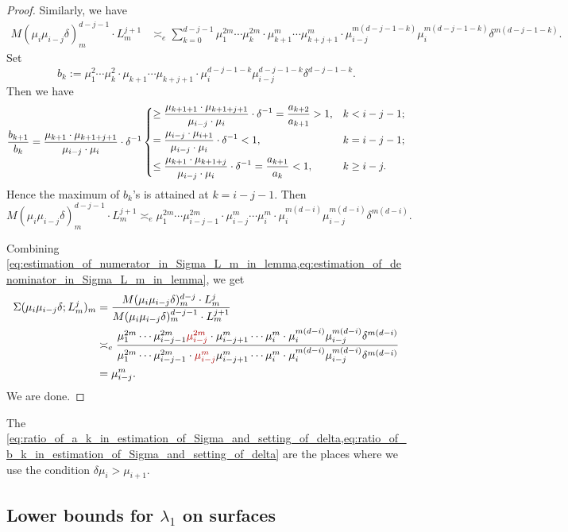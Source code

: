 \begin{proof}
    Similarly, we have
    \begin{align*}
      M(\mu_i \mu_{i-j} \delta)_m^{d-j-1} \cdot L_m^{j+1} & \asymp_e \sum_{k=0}^{d-j-1} \mu_1^{2m} \cdots \mu_k^{2m} \cdot \mu_{k+1}^m \cdots \mu_{k+j+1}^m \cdot \mu_{i-j}^{m(d-j-1-k)} \mu_i^{m(d-j-1-k)} \delta^{m(d-j-1-k)}.
    \end{align*}
    Set 
    \[ b_k := \mu_1^2 \cdots \mu_k^2 \cdot \mu_{k+1} \cdots \mu_{k+j+1} \cdot \mu_i^{d-j-1-k} \mu_{i-j}^{d-j-1-k} \delta^{d-j-1-k}. \]
    Then we have
    \begin{equation}\label{eq:ratio_of_b_k_in_estimation_of_Sigma_and_setting_of_delta}
      \frac{b_{k+1}}{b_k} = \frac{\mu_{k+1} \cdot \mu_{k+1+j+1}}{\mu_{i-j} \cdot \mu_i} \cdot \delta^{-1} 
      \begin{dcases}
      \geq \dfrac{\mu_{k+1+1} \cdot \mu_{k+1+j+1}}{\mu_{i-j} \cdot \mu_i} \cdot \delta^{-1} = \frac{a_{k+2}}{a_{k+1}} > 1, & k < i-j-1; \\
      = \dfrac{\mu_{i-j} \cdot \mu_{i+1}}{\mu_{i-j} \cdot \mu_i} \cdot \delta^{-1} < 1, & k = i-j-1; \\
      \leq \dfrac{\mu_{k+1} \cdot \mu_{k+1+j}}{\mu_{i-j} \cdot \mu_i} \cdot \delta^{-1} = \frac{a_{k+1}}{a_k} < 1, & k \geq i-j.
    \end{dcases}
    \end{equation}
    Hence the maximum of $b_k$'s is attained at $k = i-j-1$.
    Then
    \begin{equation}\label{eq:estimation_of_denominator_in_Sigma_L_m_in_lemma}
      M(\mu_i \mu_{i-j} \delta)_m^{d-j-1} \cdot L_m^{j+1} \asymp_e \mu_1^{2m} \cdots \mu_{i-j-1}^{2m} \cdot \mu_{i-j}^m \cdots \mu_{i}^m \cdot \mu_i^{m(d-i)} \mu_{i-j}^{m(d-i)} \delta^{m(d-i)}.
    \end{equation}

    Combining \cref{eq:estimation_of_numerator_in_Sigma_L_m_in_lemma,eq:estimation_of_denominator_in_Sigma_L_m_in_lemma}, we get 
    \begin{align*}
      \Sigma(\mu_i \mu_{i-j} \delta; L_m^j)_m & = \frac{M(\mu_i \mu_{i-j} \delta)_m^{d-j} \cdot L_m^{j}}{M(\mu_i \mu_{i-j} \delta)_m^{d-j-1} \cdot L_m^{j+1}} \\
      & \asymp_e \frac{\mu_1^{2m} \cdots \mu_{i-j-1}^{2m} \alert{\mu_{i-j}^{2m}} \cdot \mu_{i-j+1}^m \cdots \mu_{i}^m \cdot \mu_i^{m(d-i)} \mu_{i-j}^{m(d-i)} \delta^{m(d-i)}}{\mu_1^{2m} \cdots \mu_{i-j-1}^{2m} \cdot \alert{\mu_{i-j}^m} \mu_{i-j+1}^m \cdots \mu_{i}^m \cdot \mu_i^{m(d-i)} \mu_{i-j}^{m(d-i)} \delta^{m(d-i)}} \\
      & = \mu_{i-j}^{m}.
    \end{align*}
    We are done.
  \end{proof}
  \begin{remark}
    The \cref{eq:ratio_of_a_k_in_estimation_of_Sigma_and_setting_of_delta,eq:ratio_of_b_k_in_estimation_of_Sigma_and_setting_of_delta} are the places where we use the condition $\delta \mu_i > \mu_{i+1}$.
  \end{remark}


\subsection[Lower bounds for the first dynamical degree on surfaces]{Lower bounds for $\lambda_1$ on surfaces}





